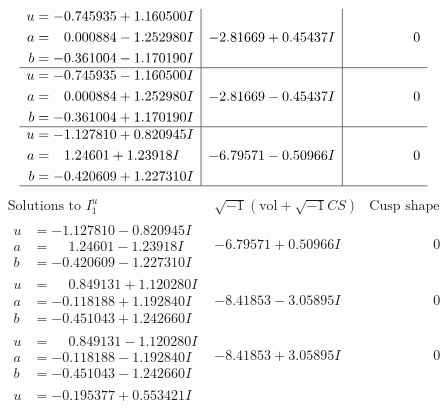\documentclass[1p]{elsarticle_modified}
\theoremstyle{definition}
\newcommand{\I}{\sqrt{-1}}
\begin{document}
$$\begin{array}{c|c|c}
\begin{aligned}
u &= -0.745935 + 1.160500 I \\
a &= \phantom{-}0.000884 - 1.252980 I \\
b &= -0.361004 - 1.170190 I\end{aligned}
 & -2.81669 + 0.45437 I & \phantom{-0.000000 } 0 \\ \hline\begin{aligned}
u &= -0.745935 - 1.160500 I \\
a &= \phantom{-}0.000884 + 1.252980 I \\
b &= -0.361004 + 1.170190 I\end{aligned}
 & -2.81669 - 0.45437 I & \phantom{-0.000000 } 0 \\ \hline\begin{aligned}
u &= -1.127810 + 0.820945 I \\
a &= \phantom{-}1.24601 + 1.23918 I \\
b &= -0.420609 + 1.227310 I\end{aligned}
 & -6.79571 - 0.50966 I & \phantom{-0.000000 } 0\\
 \hline 
 \end{array}$$\newpage$$\begin{array}{c|c|c}  
\text{Solutions to }I^u_{1}& \I (\text{vol} + \sqrt{-1}CS) & \text{Cusp shape}\\
 \hline 
\begin{aligned}
u &= -1.127810 - 0.820945 I \\
a &= \phantom{-}1.24601 - 1.23918 I \\
b &= -0.420609 - 1.227310 I\end{aligned}
 & -6.79571 + 0.50966 I & \phantom{-0.000000 } 0 \\ \hline\begin{aligned}
u &= \phantom{-}0.849131 + 1.120280 I \\
a &= -0.118188 + 1.192840 I \\
b &= -0.451043 + 1.242660 I\end{aligned}
 & -8.41853 - 3.05895 I & \phantom{-0.000000 } 0 \\ \hline\begin{aligned}
u &= \phantom{-}0.849131 - 1.120280 I \\
a &= -0.118188 - 1.192840 I \\
b &= -0.451043 - 1.242660 I\end{aligned}
 & -8.41853 + 3.05895 I & \phantom{-0.000000 } 0 \\ \hline\begin{aligned}
u &= -0.195377 + 0.553421 I \\

\end{aligned}
\end{array}$$
\end{document}
